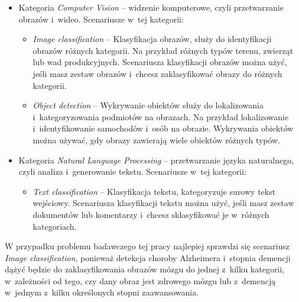 \begin{itemize}
  \item Kategoria \emph{Computer Vision} -- widzenie komputerowe, czyli przetwarzanie obrazów i~wideo.
        Scenariusze w~tej kategorii:
        \begin{itemize}

          \item \emph{Image classification} -- Klasyfikacja obrazów, służy do identyfikacji obrazów różnych kategorii.
                Na przykład różnych typów terenu, zwierząt lub wad produkcyjnych.
                Scenariusza klasyfikacji obrazów można użyć, jeśli masz zestaw obrazów i~chcesz zaklasyfikować obrazy do różnych kategorii.

          \item \emph{Object detection} -- Wykrywanie obiektów służy do lokalizowania i~kategoryzowania podmiotów na obrazach.
          Na przykład lokalizowanie i~identyfikowanie samochodów i~osób na obrazie.
          Wykrywania obiektów można używać, gdy obrazy zawierają wiele obiektów różnych typów.

        \end{itemize}

  \item Kategoria \emph{Natural Language Processing} -- przetwarzanie języka naturalnego, czyli analiza i~generowanie tekstu.
        Scenariusze w~tej kategorii:

        \begin{itemize}

          \item \emph{Text classification} -- Klasyfikacja tekstu, kategoryzuje surowy tekst wejściowy.
          Scenariusza klasyfikacji tekstu można użyć, jeśli masz zestaw dokumentów lub komentarzy i~chcesz sklasyfikować je w~różnych kategoriach.

        \end{itemize}

\end{itemize}

W przypadku problemu badawczego tej pracy najlepiej sprawdzi się scenariusz \emph{Image classification}, ponieważ detekcja choroby Alzheimera i~stopnia demencji dążyć będzie do zaklasyfikowania obrazów mózgu do jednej z~kilku kategorii, w~zależności od tego, czy dany obraz jest zdrowego mózgu lub z~demencją w~jednym z~kilku określonych stopni zaawansowania.

